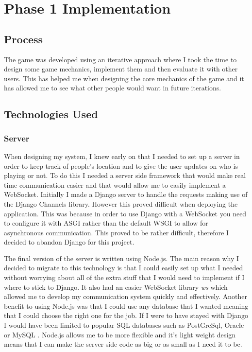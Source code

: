 \documentclass{l4proj}
\begin{document}
\chapter{Phase 1 Implementation}

\section{Process}
\label{process}
The game was developed using an iterative approach where I took the time to design some game mechanics, implement them and
then evaluate it with other users. This has helped me when designing the core mechanics of the game and it has allowed me
to see what other people would want in future iterations.

\section{Technologies Used}

\subsection{Server}
\label{implementationServer}
When designing my system, I knew early on that I needed to set up a server in order to keep track of people's location
and to give the user updates on who is playing or not. To do this I needed a server side framework that would make real
time communication easier and that would allow me to easily implement a WebSocket. Initially I made a Django server to
handle the requests making use of the Django Channels library. However this proved difficult when deploying the application.
This was because in order to use Django with a WebSocket you need to configure it with ASGI rather than the default WSGI
to allow for asynchronous communication. This proved to be rather difficult, therefore I decided to abandon Django for this
project.

The final version of the server is written using Node.js. The main reason why I decided to migrate to this technology is that
I could easily set up what I needed without worrying about all of the extra stuff that I would need to implement if I where to
stick to Django. It also had an easier WebSocket library \emph{ws} which allowed me to develop my communication system quickly
and effectively. Another benefit to using Node.js was that I could use any database that I wanted meaning that I could
choose the right one for the job. If I were to have stayed with Django I would have been limited to popular SQL databases
such as PostGreSql, Oracle or MySQL \citep{djangoDatabases}. Node.js allows me to be more flexible and it's light weight
design means that I can make the server side code as big or as small as I need it to be.
\end{document}
